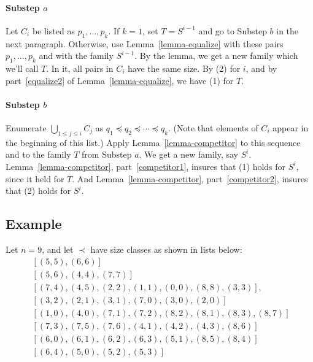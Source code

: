 \documentclass[12pt]{article}
\theoremstyle{definition}
\newcommand{\rem}[1]{\relax}
\begin{document}
 \paragraph{Substep $a$}
 Let $C_i$ be listed as $p_1, \ldots, p_k$.
 If $k = 1$, set $T = S^{i-1}$ and go to  Substep $b$ in the 
 next paragraph.  Otherwise, 
  use Lemma~\ref{lemma-equalize} with these pairs 
  $p_1, \ldots, p_k$ and with the family
  $S^{i-1}$.
  By the lemma, we get a new family which we'll call $T$.
  In it, all pairs in $C_i$ have the same size.
 By (2) for $i$, and by part~\ref{equalize2} of Lemma~\ref{lemma-equalize},
 we have (1) for $T$.
  
 \paragraph{Substep $b$}  
Enumerate $\bigcup_{1\leq j \leq i} C_j$ as 
$q_1 \preceq q_2\preceq \cdots \preceq q_k$.
(Note that elements of $C_i$
appear in the beginning of this list.)
Apply Lemma~\ref{lemma-competitor}
to this sequence and to the family $T$
from Substep $a$.  We get a new family, say 
$S^i$.  
Lemma~\ref{lemma-competitor}, part~\ref{competitor1}, insures that (1) holds for $S^i$, since it held for $T$.
 And Lemma~\ref{lemma-competitor}, part~\ref{competitor2},
 insures that (2) holds for $S^i$.
 
 \subsection{Example}
 
 \rem{
 task6 = [[(5,5),(6,6)], [(5,6),(4,4),(7,7)], 
         [(7,4),(4,5),(2, 2),(1,1),(0,0),(8,8), (3,3)], [(3, 2),  (2, 1),(3, 1),(7,0),(3, 0), (2, 0)],
	    [(1, 0), (4,0),(7,1),(7,2), (8,2),(8,1), (8,3), (8,7)], 
         [(7,3), (7,5),(7,6),(4,1),(4,2), (4,3), (8,6)],
	    [(6,0),(6,1),(6,2),(6,3),(5,1), (8,5), (8,4)],
         [(6,4),(5,0),(5,2),(5,3)]]
insertionSort(task6)
}




 Let $n = 9$, and let $\prec$ have size classes as shown in lists below:
 \[
 \begin{array}{l}
\ [(5,5),(6,6)] \\
 \  [(5,6),(4,4),(7,7)] \\
  \  [(7,4),(4,5),(2, 2),(1,1),(0,0),(8,8), (3,3)],\\
  \ [(3, 2),  (2, 1),(3, 1),(7,0),(3, 0), (2, 0)]\\
\	    [(1, 0), (4,0),(7,1),(7,2), (8,2),(8,1), (8,3), (8,7)]\\
 \        [(7,3), (7,5),(7,6),(4,1),(4,2), (4,3), (8,6)] \\
\	    [(6,0),(6,1),(6,2),(6,3),(5,1), (8,5), (8,4)]\\
 \        [(6,4),(5,0),(5,2),(5,3)]
         \end{array}
 \]
\end{document}
